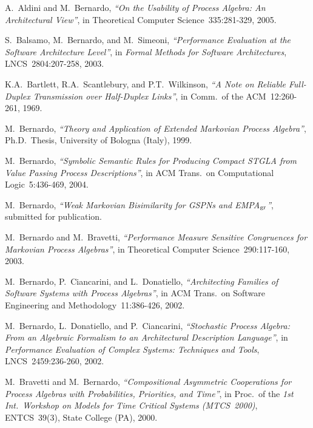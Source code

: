 \begin{thebibliography}{00}

 A.~Aldini and M.~Bernardo,
{\it ``On the Usability of Process Algebra: An Architectural View''},
in Theoretical Computer Science~335:281-329, 2005.

 S.~Balsamo, M.~Bernardo, and M.~Simeoni,
{\it ``Performance Evaluation at the Software Architecture Level''},
in {\it Formal Methods for Software Architectures},
LNCS~2804:207-258, 2003.

 K.A.~Bartlett, R.A.~Scantlebury, and P.T.~Wilkinson,
{\it ``A Note on Reliable Full-Duplex Transmission over Half-Duplex Links''},
in Comm.\ of the ACM~12:260-261, 1969.

 M.~Bernardo,
{\it ``Theory and Application of Extended Markovian Process Algebra''},
Ph.D.\ Thesis, University of Bologna (Italy), 1999.

 M.~Bernardo,
{\it ``Symbolic Semantic Rules for Producing Compact STGLA from Value Passing Process Descriptions''},
in ACM Trans.\ on Computational Logic~5:436-469, 2004.

 M.~Bernardo,
{\it ``Weak Markovian Bisimilarity for GSPNs and EMPA$_{\rm gr}$''},
submitted for publication.

 M.~Bernardo and M.~Bravetti,
{\it ``Performance Measure Sensitive Congruences for Markovian Process Algebras''},
in Theoretical Computer Science~290:117-160, 2003.

 M.~Bernardo, P.~Ciancarini, and L.~Donatiello,
{\it ``Architecting Families of Software Systems with Process Algebras''},
in ACM Trans.\ on Software Engineering and Methodology~11:386-426, 2002.

 M.~Bernardo, L.~Donatiello, and P.~Ciancarini,
{\it ``Stochastic Process Algebra: From an Algebraic Formalism to an Architectural Description Language''},
in {\it Performance Evaluation of Complex Systems: Techniques and Tools},
LNCS~2459:236-260, 2002.

 M.~Bravetti and M.~Bernardo,
{\it ``Compositional Asymmetric Cooperations for Process Algebras with Probabilities, Priorities, and
Time''},
in Proc.\ of the {\it 1st Int.\ Workshop on Models for Time Critical Systems (MTCS~2000)},
ENTCS~39(3),
State College (PA), 2000.


\end{thebibliography}
